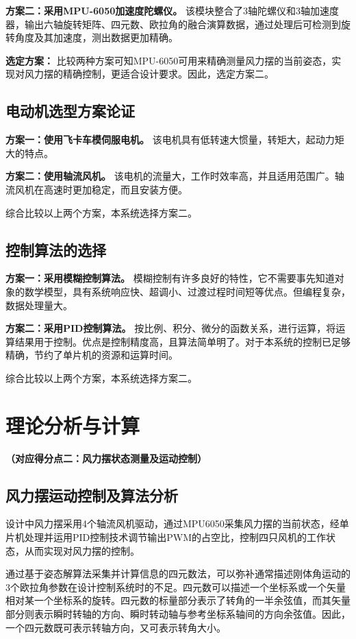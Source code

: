 \documentclass[zihao=-4,fontset=none]{ctexart}
\begin{document}
\textbf{方案二：采用MPU-6050加速度陀螺仪。} 该模块整合了3轴陀螺仪和3轴加速度器，输出六轴旋转矩阵、四元数、欧拉角的融合演算数据，通过处理后可检测到旋转角度及其加速度，测出数据更加精确。

\textbf{选定方案：} 比较两种方案可知MPU-6050可用来精确测量风力摆的当前姿态，实现对风力摆的精确控制，更适合设计要求。因此，选定方案二。

\subsection{电动机选型方案论证}

\textbf{方案一：使用飞卡车模伺服电机。} 该电机具有低转速大惯量，转矩大，起动力矩大的特点。

\textbf{方案二：使用轴流风机。} 该电机的流量大，工作时效率高，并且适用范围广。轴流风机在高速时更加稳定，而且安装方便。

综合比较以上两个方案，本系统选择方案二。

\subsection{控制算法的选择}

\textbf{方案一：采用模糊控制算法。} 模糊控制有许多良好的特性，它不需要事先知道对象的数学模型，具有系统响应快、超调小、过渡过程时间短等优点。但编程复杂，数据处理量大。

\textbf{方案二：采用PID控制算法。} 按比例、积分、微分的函数关系，进行运算，将运算结果用于控制。优点是控制精度高，且算法简单明了。对于本系统的控制已足够精确，节约了单片机的资源和运算时间。

综合比较以上两个方案，本系统选择方案二。

\section{理论分析与计算}
\textbf{（对应得分点二：风力摆状态测量及运动控制）}

\subsection{风力摆运动控制及算法分析}

设计中风力摆采用4个轴流风机驱动，通过MPU6050采集风力摆的当前状态，经单片机处理并运用PID控制技术调节输出PWM的占空比，控制四只风机的工作状态，从而实现对风力摆的控制。

通过基于姿态解算法采集并计算信息的四元数法，可以弥补通常描述刚体角运动的3个欧拉角参数在设计控制系统时的不足。四元数可以描述一个坐标系或一个矢量相对某一个坐标系的旋转。四元数的标量部分表示了转角的一半余弦值，而其矢量部分则表示瞬时转轴的方向、瞬时转动轴与参考坐标系轴间的方向余弦值。因此，一个四元数既可表示转轴方向，又可表示转角大小。
\end{document}
